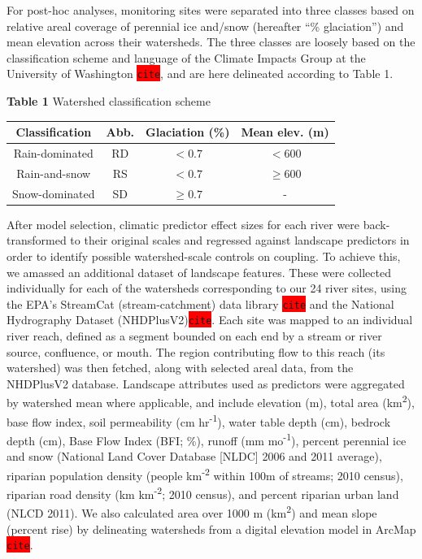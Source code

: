 \documentclass{article}
\begin{document}
For post-hoc analyses, monitoring sites were separated into three classes based on relative areal coverage of perennial ice and/snow (hereafter ``\% glaciation'') and mean elevation across their watersheds. The three classes are loosely based on the classification scheme and language of the Climate Impacts Group at the University of Washington \colorbox{red}{\lstinline{cite}}, and are here delineated according to Table 1.

\begin{center}
\textbf{Table 1} Watershed classification scheme
\end{center}
\begin{center}
\begin{tabular}{ |c|c|c|c| } 
 \hline
 Classification & Abb. & Glaciation (\%) & Mean elev. (m) \\
 \hline
 Rain-dominated & RD & $< 0.7$ & $< 600$ \\
 Rain-and-snow & RS & $< 0.7$ & $\geq 600$ \\
 Snow-dominated & SD & $\geq 0.7$ & - \\
 \hline
\end{tabular}
\end{center}

After model selection, climatic predictor effect sizes for each river were back-transformed to their original scales and regressed against landscape predictors in order to identify possible watershed-scale controls on coupling. To achieve this, we amassed an additional dataset of landscape features. These were collected individually for each of the watersheds corresponding to our 24 river sites, using the EPA's StreamCat (stream-catchment) data library \colorbox{red}{\lstinline{cite}} and the National Hydrography Dataset (NHDPlusV2)\colorbox{red}{\lstinline{cite}}. Each site was mapped to an individual river reach, defined as a segment bounded on each end by a stream or river source, confluence, or mouth. The region contributing flow to this reach (its watershed) was then fetched, along with selected areal data, from the NHDPlusV2 database. Landscape attributes used as predictors were aggregated by watershed mean where applicable, and include elevation (m), total area (km\textsuperscript{2}), base flow index, soil permeability (cm hr\textsuperscript{-1}), water table depth (cm), bedrock depth (cm), Base Flow Index (BFI; \%), runoff (mm mo\textsuperscript{-1}), percent perennial ice and snow (National Land Cover Database [NLDC] 2006 and 2011 average), riparian population density (people km\textsuperscript{-2} within 100m of streams; 2010 census), riparian road density (km km\textsuperscript{-2}; 2010 census), and percent riparian urban land (NLCD 2011). We also calculated area over 1000 m (km\textsuperscript{2}) and mean slope (percent rise) by delineating watersheds from a digital elevation model in ArcMap \colorbox{red}{\lstinline{cite}}.
\end{document}
